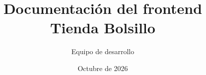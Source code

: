 \title{\textbf{Documentación del frontend}\\[0.4em]\large Tienda Bolsillo}
\author{Equipo de desarrollo}
\date{Octubre de 2026}
